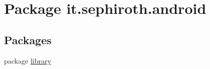 \hypertarget{namespaceit_1_1sephiroth_1_1android}{}\section{Package it.\+sephiroth.\+android}
\label{namespaceit_1_1sephiroth_1_1android}
\subsection*{Packages}
\begin{DoxyCompactItemize}
\item 
package \hyperlink{namespaceit_1_1sephiroth_1_1android_1_1library}{library}
\end{DoxyCompactItemize}
